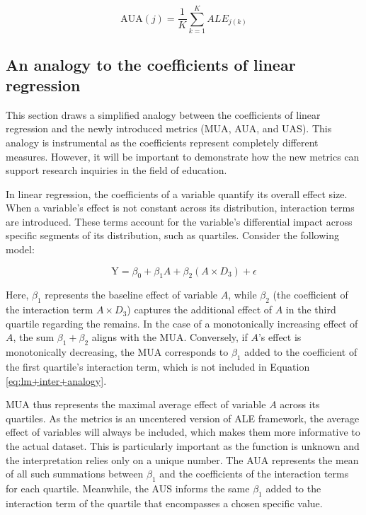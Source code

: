 \begin{equation}
\label{eq:AUA}
\text{AUA}(j) = \frac{1}{K} \sum_{k=1}^{K} ALE_{j(k)}
\end{equation}


\subsection{An analogy to the coefficients of linear regression}

This section draws a simplified analogy between the coefficients of linear regression and the newly introduced metrics (\gls{MUA}, \gls{AUA}, and \gls{UAS}). This analogy is instrumental as the coefficients represent completely different measures. However, it will be important to demonstrate how the new metrics can support research inquiries in the field of education.

In linear regression, the coefficients of a variable quantify its overall effect size. When a variable's effect is not constant across its distribution, interaction terms are introduced. These terms account for the variable's differential impact across specific segments of its distribution, such as quartiles. Consider the following model:

\begin{equation}
\label{eq:lm+inter+analogy}
\text{Y} = \beta_0 + \beta_1 A + \beta_2 (A \times D_3) + \epsilon
\end{equation}

Here, \(\beta_1\) represents the baseline effect of variable \(A\), while \(\beta_2\) (the coefficient of the interaction term \(A \times D_3\)) captures the additional effect of \(A\) in the third quartile regarding the remains. In the case of a monotonically increasing effect of \(A\), the sum \(\beta_1 + \beta_2\) aligns with the \gls{MUA}. Conversely, if \(A\)'s effect is monotonically decreasing, the \gls{MUA} corresponds to \(\beta_1\) added to the coefficient of the first quartile's interaction term, which is not included in Equation \ref{eq:lm+inter+analogy}.

\gls{MUA} thus represents the maximal average effect of variable \(A\) across its quartiles. As the metrics is an uncentered version of \gls{ALE} framework, the average effect of variables will always be included, which makes them more informative to the actual dataset. This is particularly important as the function is unknown and the interpretation relies only on a unique number. The \gls{AUA} represents the mean of all such summations between \(\beta_1\) and the coefficients of the interaction terms for each quartile. Meanwhile, the \gls{AUS} informs the same \(\beta_1\) added to the interaction term of the quartile that encompasses a chosen specific value. 

